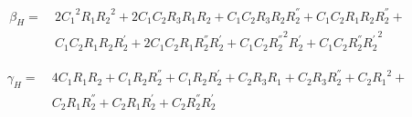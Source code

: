 \documentclass[a4paper]{article}
\begin{document}
\begin{equation*}
\begin{split}
	\beta_H =\ & 2 {C_{1}}^{2} R_{1} {R_{2}}^{2} + 2 C_{1} C_{2} R_{3} R_{1} R_{2} + C_{1} C_{2} R_{3} R_{2} R_{2}^{''} + C_{1} C_{2} R_{1} R_{2} R_{2}^{''} +\\
	&C_{1} C_{2} R_{1} R_{2} R_{2}^{'} + 2 C_{1} C_{2} R_{1} R_{2}^{''} R_{2}^{'} + C_{1} C_{2} {R_{2}^{''}}^{2} R_{2}^{'} + C_{1} C_{2} R_{2}^{''} {R_{2}^{'}}^{2}
\end{split}
\end{equation*}

\begin{equation*}
\begin{split}
	\gamma_H =\ & 4 C_{1} R_{1} R_{2} + C_{1} R_{2} R_{2}^{''} + C_{1} R_{2} R_{2}^{'} + C_{2} R_{3} R_{1} + C_{2} R_{3} R_{2}^{''} + C_{2} {R_{1}}^{2} +\\
	&C_{2} R_{1} R_{2}^{''} + C_{2} R_{1} R_{2}^{'} + C_{2} R_{2}^{''} R_{2}^{'}
\end{split}
\end{equation*}
\end{document}
